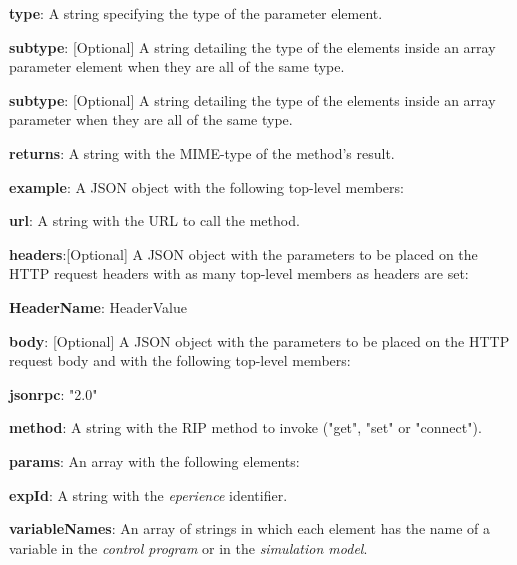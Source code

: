 \begin{myEnumerate}
\begin{myEnumerate}
\begin{myEnumerate}
\begin{myEnumerate}
\begin{myEnumerate}
                    \item \textbf{type}: A string specifying the type of the parameter element.
                    \item \textbf{subtype}: [Optional] A string detailing the type of the elements inside an array parameter element when they are all of the same type.
                \end{myEnumerate}
                \item \textbf{subtype}: [Optional] A string detailing the type of the elements inside an array parameter when they are all of the same type.
            \end{myEnumerate}
            \item \textbf{returns}: A string with the MIME-type of the method's result.
            \item \textbf{example}: A JSON object with the following top-level members:
            \begin{myEnumerate}
                    \item \textbf{url}: A string with the URL to call the method.
                    \item \textbf{headers}:[Optional] A JSON object with the parameters to be placed on the HTTP request headers with as many top-level members as headers are set:
                    \begin{myEnumerate}
                        \item \textbf{HeaderName}: HeaderValue
                    \end{myEnumerate}
                    \item \textbf{body}: [Optional] A JSON object with the parameters to be placed on the HTTP request body and with the following top-level members:
                    \begin{myEnumerate}
                        \item \textbf{jsonrpc}: "2.0"
                        \item \textbf{method}: A string with the RIP method to invoke ("get", "set" or "connect"). %
                        \item \textbf{params}: An array with the following elements:
                        \begin{myEnumerate}
                            \item \textbf{expId}: A string with the \textit{eperience} identifier.
                            \item \textbf{variableNames}: An array of strings in which each element has the name of a variable in the \textit{control program} or in the \textit{simulation model}.

\end{myEnumerate}
\end{myEnumerate}
\end{myEnumerate}
\end{myEnumerate}
\end{myEnumerate}
\end{myEnumerate}
